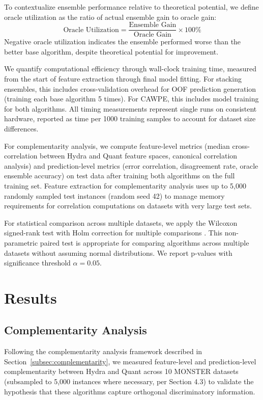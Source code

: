 \documentclass[pdflatex,sn-basic]{sn-jnl}           %
\theoremstyle{thmstyleone}%
\theoremstyle{thmstyletwo}%
\theoremstyle{thmstylethree}%
\begin{document}
To contextualize ensemble performance relative to theoretical potential, we define oracle utilization as the ratio of actual ensemble gain to oracle gain:
\begin{equation}
\text{Oracle Utilization} = \frac{\text{Ensemble Gain}}{\text{Oracle Gain}} \times 100\%
\end{equation}
Negative oracle utilization indicates the ensemble performed worse than the better base algorithm, despite theoretical potential for improvement.

We quantify computational efficiency through wall-clock training time, measured from the start of feature extraction through final model fitting. For stacking ensembles, this includes cross-validation overhead for OOF prediction generation (training each base algorithm 5 times). For CAWPE, this includes model training for both algorithms. All timing measurements represent single runs on consistent hardware, reported as time per 1000 training samples to account for dataset size differences.

For complementarity analysis, we compute feature-level metrics (median cross-correlation between Hydra and Quant feature spaces, canonical correlation analysis) and prediction-level metrics (error correlation, disagreement rate, oracle ensemble accuracy) on test data after training both algorithms on the full training set. Feature extraction for complementarity analysis uses up to 5,000 randomly sampled test instances (random seed 42) to manage memory requirements for correlation computations on datasets with very large test sets.

For statistical comparison across multiple datasets, we apply the Wilcoxon signed-rank test with Holm correction for multiple comparisons \citep{tsc-bakeoff}. This non-parametric paired test is appropriate for comparing algorithms across multiple datasets without assuming normal distributions. We report p-values with significance threshold $\alpha=0.05$.

\clearpage

\section{Results}\label{sec5}

\subsection{Complementarity Analysis}

Following the complementarity analysis framework described in Section~\ref{subsec:complementarity}, we measured feature-level and prediction-level complementarity between Hydra and Quant across 10 MONSTER datasets (subsampled to 5,000 instances where necessary, per Section 4.3) to validate the hypothesis that these algorithms capture orthogonal discriminatory information.
\end{document}
